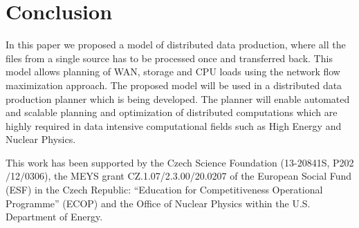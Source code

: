 \documentclass{svjour3}                     %
\begin{document}
\section{Conclusion}
\label{Conclusion}

In this paper we proposed a model of distributed data production, where all
the files from a single source has to be processed once and transferred back.
This model allows planning of WAN, storage and CPU loads using the network
flow maximization approach. The proposed model will be used in a distributed
data production planner which is being developed. The planner will enable
automated and scalable planning and optimization of distributed computations
which are highly required in data intensive computational fields such as High Energy and Nuclear Physics.

\begin{acknowledgements}
This work has been supported by the Czech Science Foundation
(13-20841S, P202$/$12$/$0306),  the MEYS grant CZ.1.07/2.3.00/20.0207 of the European Social Fund (ESF) in the Czech Republic: “Education for Competitiveness Operational Programme” (ECOP) and the Office of Nuclear Physics within the U.S. Department of Energy.  
\end{acknowledgements}

{}

\end{document}
